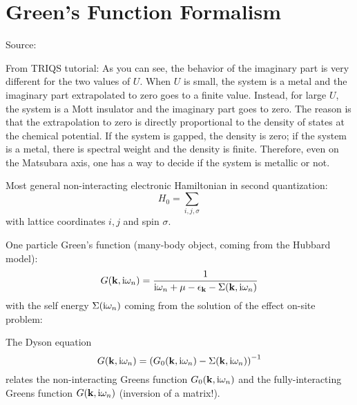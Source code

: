 \chapter{Green's Function Formalism}\label{ch:green's-function-formalism}

Source: \cite{Bruus_Flensberg_2004}

From TRIQS tutorial:
As you can see, the behavior of the imaginary part is very different for the two values of $U$. When
$U$ is small, the system is a metal and the imaginary part extrapolated to zero goes to a finite value.
Instead, for large $U$, the system is a Mott insulator and the imaginary part goes to zero. The reason
is that the extrapolation to zero is directly proportional to the density of states at the chemical
potential. If the system is gapped, the density is zero; if the system is a metal, there is spectral
weight and the density is finite. Therefore, even on the Matsubara axis, one has a way to decide if the
system is metallic or not.


Most general non-interacting electronic Hamiltonian in second quantization:
\begin{equation}
    H_0 = \sum_{i, j, \sigma}
\end{equation}
with lattice coordinates \(i, j\) and spin \(\sigma\).



One particle Green's function (many-body object, coming from the Hubbard model):
\begin{equation}
    G(\bm{\mathrm{k}}, \mathrm{i} \omega_n) = \frac{1}{\mathrm{i} \omega_n + \mu - \epsilon_{\bm{\mathrm{k}}} - \Sigma(\bm{\mathrm{k}}, \mathrm{i} \omega_n)}
\end{equation}
with the self energy \(\Sigma(\mathrm{i} \omega_n)\) coming from the solution of the effect on-site problem:

The Dyson equation
\begin{equation}
    G(\bm{\mathrm{k}}, \mathrm{i} \omega_n) = \left( G_0 (\bm{\mathrm{k}}, \mathrm{i} \omega_n) - \Sigma(\bm{\mathrm{k}}, \mathrm{i} \omega_n)\right)^{-1}
\end{equation}
relates the non-interacting Greens function \(G_0 (\bm{\mathrm{k}}, \mathrm{i} \omega_n)\) and the fully-interacting Greens function \(G (\bm{\mathrm{k}}, \mathrm{i} \omega_n)\) (inversion of a matrix!).





